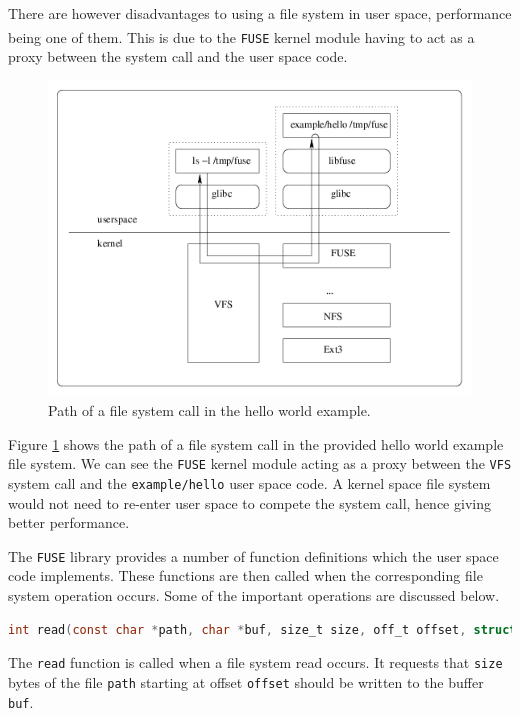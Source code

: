 \documentclass[paper=a4, fontsize=11pt,twoside]{scrartcl}
\numberwithin{table}{section}
\numberwithin{figure}{section}
\numberwithin{algorithm}{section}
\begin{document}
There are however disadvantages to using a file system in user space, performance being one of them\textsuperscript{\cite{fuseper}}. This is due to the \texttt{FUSE} kernel module having to act as a proxy between the system call and the user space code.

\begin{figure}[here]
\centerline{\includegraphics[width=\textwidth]{images/fuse_structure.png}}
\caption{Path of a file system call in the hello world example.}
\label{fig:fuse}
\end{figure}

Figure \ref{fig:fuse} shows the path of a file system call in the provided hello world example file system. We can see the \texttt{FUSE} kernel module acting as a proxy between the \texttt{VFS} system call and the \texttt{example/hello} user space code. A kernel space file system would not need to re-enter user space to compete the system call, hence giving better performance. 

The \texttt{FUSE} library provides a number of function definitions which the user space code implements. These functions are then called when the corresponding file system operation occurs. Some of the important operations are discussed below.

\begin{lstlisting}[language=C, caption={\texttt{FUSE} read operation.}, frame=single]
int read(const char *path, char *buf, size_t size, off_t offset, struct fuse_file_info *fi);
\end{lstlisting}

\noindent
The \texttt{read} function is called when a file system read occurs. It requests that \texttt{size} bytes of the file \texttt{path} starting at offset \texttt{offset} should be written to the buffer \texttt{buf}.
\end{document}
